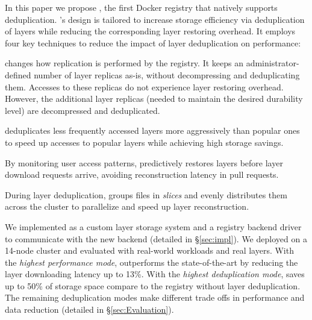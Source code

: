 In this paper we propose \sysname, the first Docker registry that natively
supports deduplication.
%
\sysname's design is tailored to
increase storage efficiency via deduplication of layers while
reducing the corresponding layer restoring overhead.
%
It employs four key techniques to reduce
the impact of layer deduplication on performance: 
%
%
\begin{compactenumerate}
\item 
\sysname changes how replication is performed by the registry.
%
It keeps an administrator-defined
number of layer replicas as-is, without decompressing and deduplicating them.
%
Accesses to these replicas do not experience layer restoring overhead.
%
However, the additional layer replicas (needed
to maintain the desired durability level)
are decompressed and deduplicated.

\item \sysname deduplicates less frequently accessed layers more
aggressively than popular ones to speed up accesses to popular
layers while achieving high storage savings.
%
\item By monitoring user access patterns, \sysname predictively
restores layers before layer download requests arrive,
avoiding reconstruction latency in pull requests.
%
\item During layer deduplication, \sysname groups files in \emph{slices} and evenly
distributes them across the cluster to parallelize and speed up layer reconstruction.
%
\end{compactenumerate}


We implemented \sysname as a custom layer storage system and
a registry backend driver to communicate
with the new backend (detailed in \S\ref{sec:impl}).
%
We deployed \sysname on a 14-node cluster and evaluated with real-world
workloads and real layers.
%
With the \emph{highest performance mode}, \sysname outperforms the
state-of-the-art by reducing the layer downloading latency up to 13\%.
%
With the \emph{highest deduplication mode}, \sysname saves up to 50\% of
storage space compare to the registry without layer deduplication.
%
The remaining deduplication modes make different trade offs in performance and
data reduction (detailed in \S\ref{sec:Evaluation}).


%
